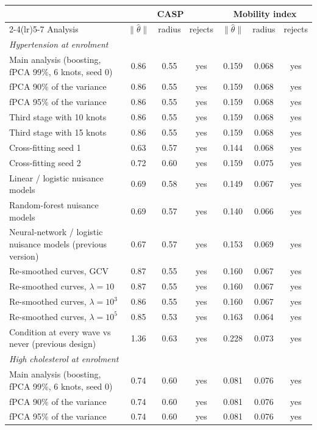\begin{tabular}{lcccccc}
\toprule
 & \multicolumn{3}{c}{CASP} & \multicolumn{3}{c}{Mobility index} \\ \cmidrule(lr){2-4}\cmidrule(lr){5-7}
Analysis & $\|\hat\theta\|$ & radius & rejects & $\|\hat\theta\|$ & radius & rejects \\
\midrule
\multicolumn{7}{l}{\textit{Hypertension at enrolment}} \\
Main analysis (boosting, fPCA 99\%, 6 knots, seed 0) & 0.86 & 0.55 & yes & 0.159 & 0.068 & yes \\
fPCA 90\% of the variance & 0.86 & 0.55 & yes & 0.159 & 0.068 & yes \\
fPCA 95\% of the variance & 0.86 & 0.55 & yes & 0.159 & 0.068 & yes \\
Third stage with 10 knots & 0.86 & 0.55 & yes & 0.159 & 0.068 & yes \\
Third stage with 15 knots & 0.86 & 0.55 & yes & 0.159 & 0.068 & yes \\
Cross-fitting seed 1 & 0.63 & 0.57 & yes & 0.144 & 0.068 & yes \\
Cross-fitting seed 2 & 0.72 & 0.60 & yes & 0.159 & 0.075 & yes \\
Linear / logistic nuisance models & 0.69 & 0.58 & yes & 0.149 & 0.067 & yes \\
Random-forest nuisance models & 0.69 & 0.57 & yes & 0.140 & 0.066 & yes \\
Neural-network / logistic nuisance models (previous version) & 0.67 & 0.57 & yes & 0.153 & 0.069 & yes \\
Re-smoothed curves, GCV & 0.87 & 0.55 & yes & 0.160 & 0.067 & yes \\
Re-smoothed curves, $\lambda=10$ & 0.87 & 0.55 & yes & 0.160 & 0.067 & yes \\
Re-smoothed curves, $\lambda=10^3$ & 0.86 & 0.55 & yes & 0.160 & 0.067 & yes \\
Re-smoothed curves, $\lambda=10^5$ & 0.85 & 0.53 & yes & 0.163 & 0.064 & yes \\
Condition at every wave vs never (previous design) & 1.36 & 0.63 & yes & 0.228 & 0.073 & yes \\
\midrule
\multicolumn{7}{l}{\textit{High cholesterol at enrolment}} \\
Main analysis (boosting, fPCA 99\%, 6 knots, seed 0) & 0.74 & 0.60 & yes & 0.081 & 0.076 & yes \\
fPCA 90\% of the variance & 0.74 & 0.60 & yes & 0.081 & 0.076 & yes \\
fPCA 95\% of the variance & 0.74 & 0.60 & yes & 0.081 & 0.076 & yes \\

\end{tabular}
